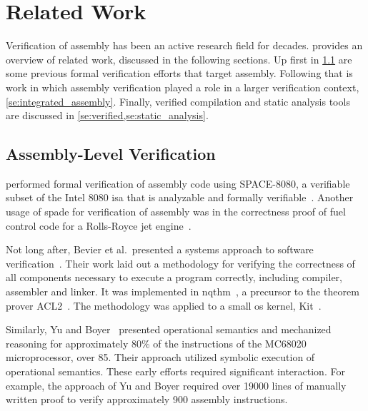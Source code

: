 \chapter{Related Work}
Verification of assembly has been an active research field for decades.
 provides an overview of related work,
discussed in the following sections.
Up first in \cref{se:previous_assembly}
are some previous formal verification efforts that target assembly.
Following that is work in which assembly verification played a role
in a larger verification context, \cref{se:integrated_assembly}.
Finally, verified compilation and static analysis tools are discussed
in \cref{se:verified,se:static_analysis}.





\section{Assembly-Level Verification}\label{se:previous_assembly}
\citet{clutterbuck1988verification} performed formal verification
of assembly code using SPACE-8080, a verifiable subset of the Intel 8080
\ac{isa} that is analyzable and formally verifiable~\citep{carre1986spade}.
Another usage of \ac{spade} for verification of assembly
was in the correctness proof of fuel control code for a Rolls-Royce
jet engine~\citet{oneill1988verification}.

Not long after, Bevier et al.\ presented a systems approach
to software verification~\citep{bevier1989approach,boyer1979computational}.
Their work laid out a methodology for verifying the correctness
of all components necessary to execute a program correctly,
including compiler, assembler and linker.
It was implemented in \ac{nqthm}~\citep{boyer1979computational},
a precursor to the theorem prover ACL2~\citep{ACL2}.
The methodology was applied to a small \ac{os} kernel, Kit~\citep{bevier1989kit}.

Similarly, Yu and Boyer~\citep{yu1992automated,boyer1996automated}
presented operational semantics and mechanized reasoning
for approximately 80\% of the instructions of the MC68020 microprocessor,
over 85.
Their approach utilized symbolic execution of operational semantics.
These early efforts required significant interaction.
For example, the approach of Yu and Boyer required over \num{19000}
lines of manually written proof to verify approximately \num{900} assembly instructions.

